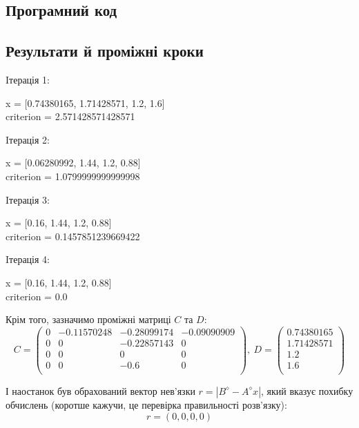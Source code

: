 \documentclass[a4paper,14pt]{extarticle} %
\begin{document}
\subsection*{Програмний код}



\subsection*{Результати й проміжні кроки}

Iтерація 1: \parbox[t]{15cm}{x = [0.74380165, 1.71428571, 1.2, 1.6] \\
            criterion = 2.571428571428571 \\ } \par

Iтерація 2: \parbox[t]{15cm}{x = [0.06280992, 1.44, 1.2, 0.88] \\
            criterion = 1.0799999999999998 \\ } \par

Iтерація 3: \parbox[t]{15cm}{x = [0.16, 1.44, 1.2, 0.88] \\
            criterion = 0.1457851239669422 \\ } \par

Iтерація 4: \parbox[t]{15cm}{x = [0.16, 1.44, 1.2, 0.88] \\
            criterion = 0.0 \\ } \par

Крім того, зазначимо проміжні матриці $C$ та $D$:
\[  
    C=
    \begin{pmatrix}
        0 & -0.11570248 & -0.28099174 & -0.09090909 \\
        0 & 0 & -0.22857143 & 0 \\
        0 & 0 & 0 & 0 \\
        0 & 0 & -0.6 & 0 \\
    \end{pmatrix},\
    D = 
    \begin{pmatrix}
        0.74380165 \\
        1.71428571 \\
        1.2 \\
        1.6 \\
    \end{pmatrix}    
\]

І наостанок був обрахований вектор нев'язки $r=|B^{\diamond}-A^{\diamond}x|$, який вказує похибку обчислень 
(коротше кажучи, це перевірка правильності розв'язку):
\[ r =  (0, 0, 0, 0) \]
            
\end{document}
